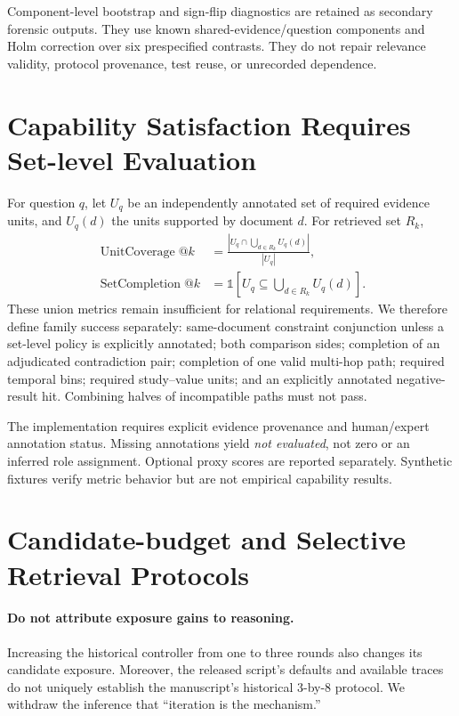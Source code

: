 \documentclass{article}
\begin{document}
Component-level bootstrap and sign-flip diagnostics are retained as secondary
forensic outputs. They use known shared-evidence/question components and
Holm correction over six prespecified contrasts. They do not repair relevance
validity, protocol provenance, test reuse, or unrecorded dependence.

\section{Capability Satisfaction Requires Set-level Evaluation}
For question $q$, let $U_q$ be an independently annotated set of required evidence
units, and $U_q(d)$ the units supported by document $d$. For retrieved set $R_k$,
\begin{align}
\operatorname{UnitCoverage}@k &=
\frac{|U_q\cap\bigcup_{d\in R_k} U_q(d)|}{|U_q|},\\
\operatorname{SetCompletion}@k &=
\mathbb{1}\!\left[U_q\subseteq\bigcup_{d\in R_k}U_q(d)\right].
\end{align}
These union metrics remain insufficient for relational requirements. We therefore
define family success separately: same-document constraint conjunction unless a
set-level policy is explicitly annotated; both comparison sides; completion of
an adjudicated contradiction pair; completion of one valid multi-hop path;
required temporal bins; required study--value units; and an explicitly annotated
negative-result hit. Combining halves of incompatible paths must not pass.

The implementation requires explicit evidence provenance and human/expert
annotation status. Missing annotations yield \emph{not evaluated}, not zero or
an inferred role assignment. Optional proxy scores are reported separately.
Synthetic fixtures verify metric behavior but are not empirical capability results.

\section{Candidate-budget and Selective Retrieval Protocols}
\paragraph{Do not attribute exposure gains to reasoning.}
Increasing the historical controller from one to three rounds also changes its
candidate exposure. Moreover, the released script's defaults and available
traces do not uniquely establish the manuscript's historical 3-by-8 protocol.
We withdraw the inference that ``iteration is the mechanism.''
\end{document}
